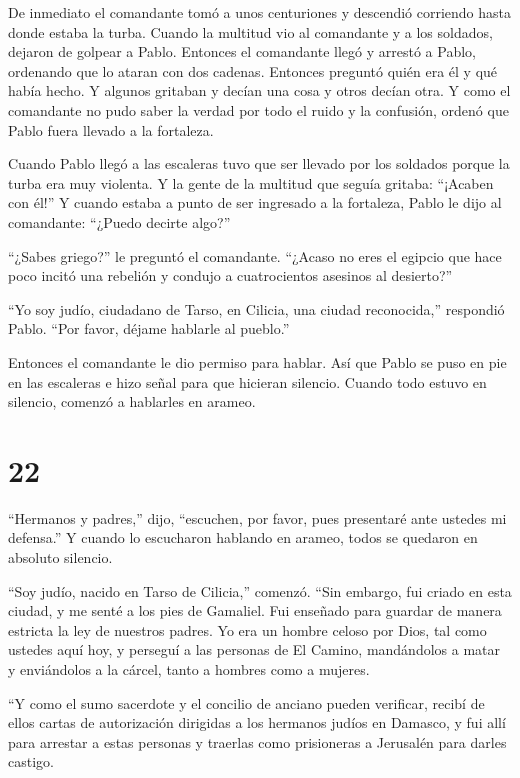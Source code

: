  De inmediato el comandante tomó a unos centuriones y
descendió corriendo hasta donde estaba la turba. Cuando la multitud vio
al comandante y a los soldados, dejaron de golpear a Pablo.
 Entonces el comandante llegó y arrestó a Pablo, ordenando
que lo ataran con dos cadenas. Entonces preguntó quién era él y qué
había hecho.  Y algunos gritaban y decían una cosa y otros
decían otra. Y como el comandante no pudo saber la verdad por todo el
ruido y la confusión, ordenó que Pablo fuera llevado a la fortaleza.

 Cuando Pablo llegó a las escaleras tuvo que ser llevado
por los soldados porque la turba era muy violenta.  Y la
gente de la multitud que seguía gritaba: ``¡Acaben con él!''
 Y cuando estaba a punto de ser ingresado a la fortaleza,
Pablo le dijo al comandante: ``¿Puedo decirte algo?''

``¿Sabes griego?'' le preguntó el comandante.  ``¿Acaso no
eres el egipcio que hace poco incitó una rebelión y condujo a
cuatrocientos asesinos al desierto?''

 ``Yo soy judío, ciudadano de Tarso, en Cilicia, una ciudad
reconocida,'' respondió Pablo. ``Por favor, déjame hablarle al pueblo.''

 Entonces el comandante le dio permiso para hablar. Así que
Pablo se puso en pie en las escaleras e hizo señal para que hicieran
silencio. Cuando todo estuvo en silencio, comenzó a hablarles en arameo.

\hypertarget{section-21}{%
\section{22}\label{section-21}}

 ``Hermanos y padres,'' dijo, ``escuchen, por favor, pues
presentaré ante ustedes mi defensa.''  Y cuando lo
escucharon hablando en arameo, todos se quedaron en absoluto silencio.

 ``Soy judío, nacido en Tarso de Cilicia,'' comenzó. ``Sin
embargo, fui criado en esta ciudad, y me senté a los pies de Gamaliel.
Fui enseñado para guardar de manera estricta la ley de nuestros padres.
Yo era un hombre celoso por Dios, tal como ustedes aquí hoy,
 y perseguí a las personas de El Camino, mandándolos a matar
y enviándolos a la cárcel, tanto a hombres como a mujeres.

 ``Y como el sumo sacerdote y el concilio de anciano pueden
verificar, recibí de ellos cartas de autorización dirigidas a los
hermanos judíos en Damasco, y fui allí para arrestar a estas personas y
traerlas como prisioneras a Jerusalén para darles castigo.

